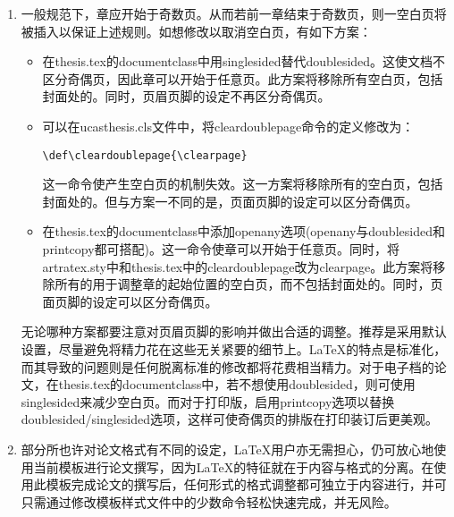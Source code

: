 \begin{enumerate}
    \item  一般规范下，章应开始于奇数页。从而若前一章结束于奇数页，则一空白页将被插入以保证上述规则。如想修改以取消空白页，有如下方案：
     \begin{itemize}
         \item 在thesis.tex的documentclass中用singlesided替代doublesided。这使文档不区分奇偶页，因此章可以开始于任意页。此方案将移除所有空白页，包括封面处的。同时，页眉页脚的设定不再区分奇偶页。
         \item 可以在ucasthesis.cls文件中，将cleardoublepage命令的定义修改为：

             \verb|\def\cleardoublepage{\clearpage}|

             这一命令使产生空白页的机制失效。这一方案将移除所有的空白页，包括封面处的。但与方案一不同的是，页面页脚的设定可以区分奇偶页。
         \item 在thesis.tex的documentclass中添加openany选项(openany与doublesided和printcopy都可搭配)。这一命令使章可以开始于任意页。同时，将artratex.sty中和thesis.tex中的cleardoublepage改为clearpage。此方案将移除所有的用于调整章的起始位置的空白页，而不包括封面处的。同时，页面页脚的设定可以区分奇偶页。
     \end{itemize}
      无论哪种方案都要注意对页眉页脚的影响并做出合适的调整。推荐是采用默认设置，尽量避免将精力花在这些无关紧要的细节上。\LaTeX{}的特点是标准化，而其导致的问题则是任何脱离标准的修改都将花费相当精力。对于电子档的论文，在thesis.tex的documentclass中，若不想使用doublesided，则可使用singlesided来减少空白页。而对于打印版，启用printcopy选项以替换doublesided/singlesided选项，这样可使奇偶页的排版在打印装订后更美观。

  \item 部分所也许对论文格式有不同的设定，\LaTeX{}用户亦无需担心，仍可放心地使用当前模板进行论文撰写，因为\LaTeX{}的特征就在于内容与格式的分离。在使用此模板完成论文的撰写后，任何形式的格式调整都可独立于内容进行，并可只需通过修改模板样式文件中的少数命令轻松快速完成，并无风险。
\end{enumerate}



